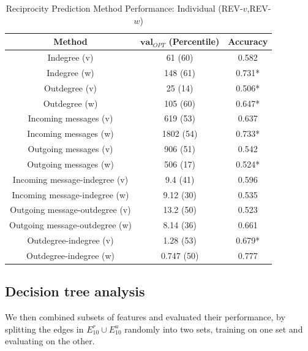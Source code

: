 \documentclass[conference]{IEEEtran}
\begin{document}
\begin{table}[!t]
\renewcommand{\arraystretch}{1.3}
\caption{Reciprocity Prediction Method Performance: Individual (REV-$v$,REV-$w$)}
\label{table_recresults_indivVW}
\centering
\begin{tabular}{|c||c|c|}
\hline
\bf{Method} & $\mathbf{val}_{OPT}$ (Percentile) & \bf{Accuracy} \\
\hline
Indegree (v) &  61 (60) & 0.582 \\
Indegree (w) & 148 (61) & 0.731* \\
Outdegree (v) & 25 (14) & 0.506* \\
Outdegree (w) & 105 (60) & 0.647* \\
\hline
Incoming messages (v) & 619 (53) & 0.637 \\
Incoming messages (w) & 1802 (54) & 0.733* \\
Outgoing messages (v) & 906 (51) & 0.542 \\
Outgoing messages (w) & 506 (17) & 0.524* \\
\hline
Incoming message-indegree (v) & 9.4 (41) & 0.596 \\
Incoming message-indegree (w) & 9.12 (30) & 0.535 \\
Outgoing message-outdegree (v) & 13.2 (50) & 0.523 \\
Outgoing message-outdegree (w) & 8.14 (36) & 0.661 \\
\hline
Outdegree-indegree (v) & 1.28 (53) & 0.679* \\
Outdegree-indegree (w) & 0.747 (50) & 0.777 \\
\hline
\end{tabular}
\end{table}

\subsection{Decision tree analysis}

We then combined subsets of features and evaluated their performance, by splitting the edges in $E^r_10 \cup E_10^u$ randomly into two sets, training on one set and evaluating on the other.
\end{document}
